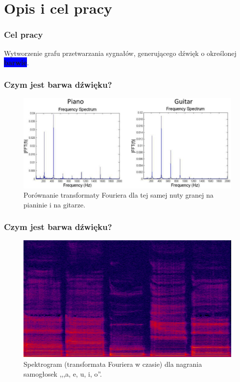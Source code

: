\documentclass[]{beamer}
\begin{document}
\section{Opis i cel pracy}
\begin{frame}
  \frametitle{Cel pracy}

  \centering
  \Large
    Wytworzenie grafu przetwarzania sygnałów, generującego dźwięk o określonej \colorbox{blue}{\color{white}\textbf{barwie}}.
\end{frame}


\begin{frame}
  \frametitle{Czym jest \textbf{barwa} dźwięku?}
  \begin{figure}
    \centering
    \includegraphics[width=0.9\linewidth]{piano_guitar_fourier.png}
    \caption{Porównanie transformaty Fouriera dla tej samej nuty granej na pianinie i na gitarze.}
  \end{figure}
\end{frame}

\begin{frame}
  \frametitle{Czym jest \textbf{barwa} dźwięku?}
  \begin{figure}
    \centering
    \includegraphics[width=0.9\linewidth]{aeuio_spectrogram.png}
    \caption{Spektrogram (transformata Fouriera w czasie) dla nagrania samogłosek ,,,a, e, u, i, o''.}
  \end{figure}
\end{frame}
\end{document}

